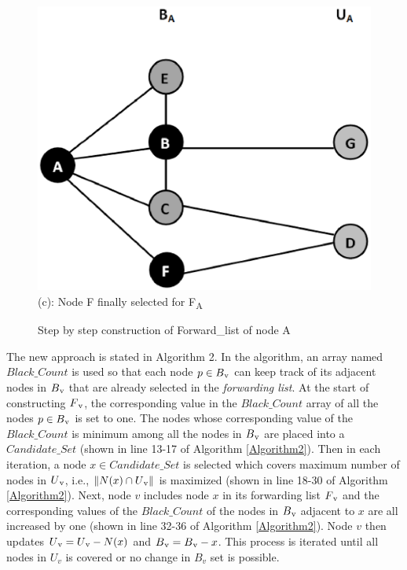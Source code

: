 \begin{figure}[h]
\begin{minipage}{.33\textwidth}
\includegraphics[width=0.8\linewidth,height=.7\linewidth]{Figures/dis3.eps}
\\(c): Node F finally selected for F\textsubscript{A}
\end{minipage}
\caption{ Step by step construction of Forward\_list of node A }
\label{dis}
\end{figure}

 The new approach is stated in Algorithm 2. In the algorithm, an array named $Black\_Count$ is used so that each node  $p \in B\textsubscript{v}$ can keep track of its adjacent nodes in $B\textsubscript{v}$  that are already selected in the \textit{forwarding list}. At the start of constructing $F\textsubscript{v}$,  the corresponding value in the $Black\_Count$ array of all the nodes $p \in B\textsubscript{v}$ is set to one. The nodes whose corresponding value of the $Black\_Count$ is minimum among all the nodes in $B\textsubscript{v}$ are placed into a $Candidate\_Set$ (shown in line 13-17 of Algorithm \ref{Algorithm2}). Then in each iteration, a node $x \in Candidate\_Set$ is selected which covers maximum number of nodes in $U\textsubscript{v}$, i.e., $\|N(x) \cap U\textsubscript{v}\|$ is maximized (shown in line 18-30 of Algorithm \ref{Algorithm2}). Next, node $v$ includes node $x$ in its forwarding list $F\textsubscript{v}$ and the corresponding values of the $Black\_Count$ of the nodes in $B\textsubscript{v}$ adjacent to $x$ are all increased by one (shown in line 32-36 of Algorithm \ref{Algorithm2}). Node $v$ then updates $U\textsubscript{v} = U\textsubscript{v} - N(x)$  and $B\textsubscript{v} = B\textsubscript{v} - x$. This process is iterated until all nodes in $U_v$ is covered or no change in $B_v$ set is possible.

